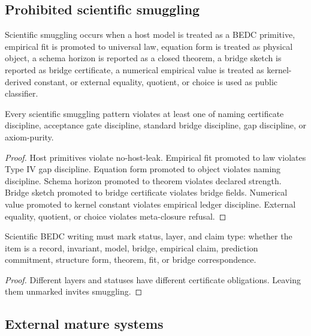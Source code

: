 \subsection{Prohibited scientific smuggling}
\label{subsec:philosophy-prohibited-scientific-smuggling}

\begin{definition}
\label{def:philosophy-scientific-smuggling}
Scientific smuggling occurs when a host model is treated as a BEDC
primitive, empirical fit is promoted to universal law, equation form is
treated as physical object, a schema horizon is reported as a closed
theorem, a bridge sketch is reported as bridge certificate, a numerical
empirical value is treated as kernel-derived constant, or external
equality, quotient, or choice is used as public classifier.
\end{definition}

\begin{theorem}
\label{thm:philosophy-scientific-smuggling-violates-gate}
Every scientific smuggling pattern violates at least one of naming
certificate discipline, acceptance gate discipline, standard bridge
discipline, gap discipline, or axiom-purity.
\end{theorem}
\begin{proof}
Host primitives violate no-host-leak. Empirical fit promoted to law
violates Type IV gap discipline. Equation form promoted to object
violates naming discipline. Schema horizon promoted to theorem violates
declared strength. Bridge sketch promoted to bridge certificate
violates bridge fields. Numerical value promoted to kernel constant
violates empirical ledger discipline. External equality, quotient, or
choice violates meta-closure refusal.
\end{proof}

\begin{corollary}
\label{cor:philosophy-scientific-writing-mark-status}
Scientific BEDC writing must mark status, layer, and claim type:
whether the item is a record, invariant, model, bridge, empirical
claim, prediction commitment, structure form, theorem, fit, or bridge
correspondence.
\end{corollary}
\begin{proof}
Different layers and statuses have different certificate obligations.
Leaving them unmarked invites smuggling.
\end{proof}

\subsection{External mature systems}
\label{subsec:philosophy-external-mature-systems}

